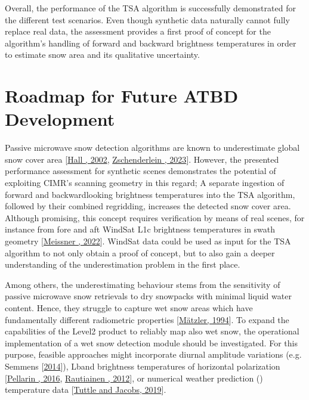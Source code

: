\documentclass[letterpaper,10pt,english]{jupyterBook}
\begin{document}
\sphinxAtStartPar
Overall, the performance of the TSA algorithm is successfully demonstrated for the different test scenarios.
Even though synthetic data naturally cannot fully replace real data, the assessment provides a first proof of concept for the algorithm’s handling of forward and backward brightness temperatures in order to estimate snow area and its qualitative uncertainty.

\sphinxstepscope


\chapter{Roadmap for Future ATBD Development}
\label{\detokenize{book/roadmap:roadmap-for-future-atbd-development}}\label{\detokenize{book/roadmap::doc}}
\sphinxAtStartPar
Passive microwave snow detection algorithms are known to underestimate global snow cover area {[}\hyperlink{cite.book/references:id2}{Hall , 2002}, \hyperlink{cite.book/references:id18}{Zschenderlein , 2023}{]}.
However, the presented performance assessment for synthetic scenes demonstrates the potential of exploiting CIMR’s scanning geometry in this regard; A separate ingestion of forward and backward\sphinxhyphen{}looking brightness temperatures into the TSA algorithm, followed by their combined regridding, increases the detected snow cover area.
Although promising, this concept requires verification by means of real scenes, for instance from fore and aft WindSat L1c brightness temperatures in swath geometry {[}\hyperlink{cite.book/references:id27}{Meissner , 2022}{]}.
WindSat data could be used as input for the TSA algorithm to not only obtain a proof of concept, but to also gain a deeper understanding of the underestimation problem in the first place.

\sphinxAtStartPar
Among others, the underestimating behaviour stems from the sensitivity of passive microwave snow retrievals to dry snowpacks with minimal liquid water content.
Hence, they struggle to capture wet snow areas which have fundamentally different radiometric properties {[}\hyperlink{cite.book/references:id13}{Mätzler, 1994}{]}.
To expand the capabilities of the Level\sphinxhyphen{}2 {\hyperref[\detokenize{book/acronyms:term-TSA}]{}} product to reliably map also wet snow, the operational implementation of a wet snow detection module should be investigated.
For this purpose, feasible approaches might incorporate diurnal amplitude variations (e.g. Semmens  {[}\hyperlink{cite.book/references:id10}{2014}{]}), L\sphinxhyphen{}band brightness temperatures of horizontal polarization {[}\hyperlink{cite.book/references:id26}{Pellarin , 2016}, \hyperlink{cite.book/references:id25}{Rautiainen , 2012}{]}, or numerical weather prediction ({\hyperref[\detokenize{book/acronyms:term-NWP}]{}}) temperature data {[}\hyperlink{cite.book/references:id24}{Tuttle and Jacobs, 2019}{]}.
\end{document}
